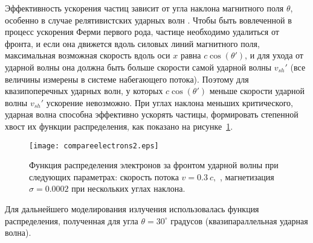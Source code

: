 Эффективность ускорения частиц зависит от угла наклона магнитного поля $\displaystyle\theta$,
особенно в случае релятивистских ударных волн \cite{SironiSpitkovsky2009pair, GuoSironi2014_1, Crumley2019, Romansky2018}. Чтобы быть вовлеченной в процесс ускорения Ферми первого рода, частице необходимо удалиться от фронта, и если
она движется вдоль силовых линий магнитного поля, максимальная возможная скорость вдоль оси $\displaystyle x$ равна $\displaystyle c\cos(\theta')$, и для ухода от ударной волны она должна быть больше скорости самой ударной волны $\displaystyle v_{sh}'$ (все величины измерены в системе набегающего потока). Поэтому для квазипоперечных ударных волн, у которых $c \cos(\theta')$ меньше скорости ударной волны $\displaystyle v_{sh}'$ ускорение невозможно. При углах наклона меньших критического, ударная волна способна эффективно ускорять частицы, формировать степенной хвост их функции распределения, как показано на рисунке~\ref{compareelectrons}.
\begin{figure}
	\centering
	\texttt{[image: compareelectrons2.eps]} 
	\caption{Функция распределения электронов за фронтом ударной волны при следующих параметрах: скорость потока \mbox{$v = 0.3~c,$} , магнетизация $\sigma = 0.0002$ при нескольких углах наклона.}
	\label{compareelectrons}
\end{figure}
 
Для дальнейшего моделирования излучения использовалась функция распределения, полученная для угла $\theta = 30^\circ$ градусов (квазипараллельная ударная волна).
 
